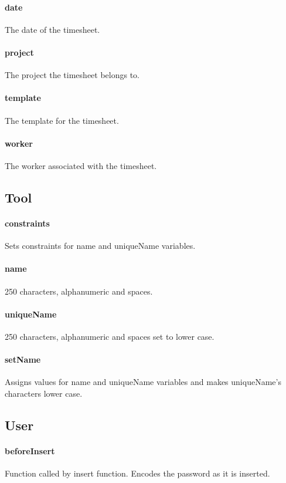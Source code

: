 \documentclass[12pt]{article}
\begin{document}
\paragraph{date} The date of the timesheet.
\paragraph{project} The project the timesheet belongs to.
\paragraph{template} The template for the timesheet.
\paragraph{worker} The worker associated with the timesheet.

\setcounter{paragraph}{0}
\subsection{Tool}\label{sec:DTool}
\paragraph{constraints} Sets constraints for name and uniqueName variables.
\paragraph{name} 250 characters, alphanumeric and spaces.
\paragraph{uniqueName} 250 characters, alphanumeric and spaces  set to lower case.
\paragraph{setName} Assigns values for name and uniqueName variables and makes uniqueName's characters lower case.

\setcounter{paragraph}{0}
\subsection{User}\label{sec:DUser}
\paragraph{beforeInsert} Function called by insert function. Encodes the password as it is inserted.
\end{document}
